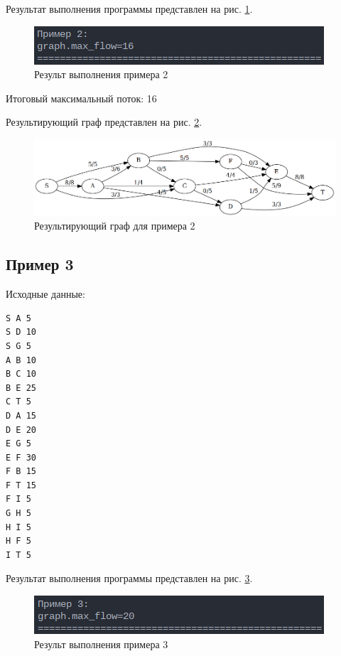 Результат выполнения программы представлен на рис. \ref{fig:example_2}.

\begin{figure}[H]
    \centering
    \includegraphics[width=\linewidth]{photo/example_2}
    \caption{Результ выполнения примера 2}
    \label{fig:example_2}
\end{figure}

Итоговый максимальный поток: 16

Результирующий граф представлен на рис. \ref{fig:example_graph_2}.

\begin{figure}[H]
    \centering
    \includegraphics[width=\linewidth]{photo/example_graph_2}
    \caption{Результирующий граф для примера 2}
    \label{fig:example_graph_2}
\end{figure}

\subsection*{Пример 3}

Исходные данные:

\begin{lstlisting}
S A 5
S D 10
S G 5
A B 10
B C 10
B E 25
C T 5
D A 15
D E 20
E G 5
E F 30
F B 15
F T 15
F I 5
G H 5
H I 5
H F 5
I T 5
\end{lstlisting}

Результат выполнения программы представлен на рис. \ref{fig:example_3}.

\begin{figure}[H]
    \centering
    \includegraphics[width=\linewidth]{photo/example_3}
    \caption{Результ выполнения примера 3}
    \label{fig:example_3}
\end{figure}


